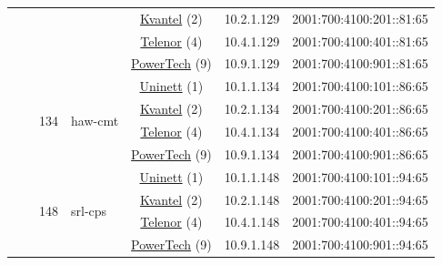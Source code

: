 \begin{small}
\begin{center}
\begin{longtable}{|c|c|c|c|c|c|c|c|}
  &  &  &  & \multicolumn{2}{|c|}{\tiny{\href{http://kvantel.no}{Kvantel} (2)}} & \tiny{10.2.1.129} & \tiny{2001:700:4100:201::81:65} \\* \cline{5-5}\cline{6-6}\cline{7-7}\cline{8-8}
  &  &  &  & \multicolumn{2}{|c|}{\tiny{\href{https://www.telenor.no}{Telenor} (4)}} & \tiny{10.4.1.129} & \tiny{2001:700:4100:401::81:65} \\* \cline{5-5}\cline{6-6}\cline{7-7}\cline{8-8}
  &  &  &  & \multicolumn{2}{|c|}{\tiny{\href{http://www.powertech.no}{PowerTech} (9)}} & \tiny{10.9.1.129} & \tiny{2001:700:4100:901::81:65} \\* \cline{3-3}\cline{4-4}\cline{5-5}\cline{6-6}\cline{7-7}\cline{8-8}
  &  & \multirow{4}{*}{\tiny{134}} & \multicolumn{1}{|l|}{\multirow{4}{*}{\tiny{haw-cmt}}} & \multicolumn{2}{|c|}{\tiny{\href{https://www.uninett.no}{Uninett} (1)}} & \tiny{10.1.1.134} & \tiny{2001:700:4100:101::86:65} \\* \cline{5-5}\cline{6-6}\cline{7-7}\cline{8-8}
  &  &  &  & \multicolumn{2}{|c|}{\tiny{\href{http://kvantel.no}{Kvantel} (2)}} & \tiny{10.2.1.134} & \tiny{2001:700:4100:201::86:65} \\* \cline{5-5}\cline{6-6}\cline{7-7}\cline{8-8}
  &  &  &  & \multicolumn{2}{|c|}{\tiny{\href{https://www.telenor.no}{Telenor} (4)}} & \tiny{10.4.1.134} & \tiny{2001:700:4100:401::86:65} \\* \cline{5-5}\cline{6-6}\cline{7-7}\cline{8-8}
  &  &  &  & \multicolumn{2}{|c|}{\tiny{\href{http://www.powertech.no}{PowerTech} (9)}} & \tiny{10.9.1.134} & \tiny{2001:700:4100:901::86:65} \\* \cline{3-3}\cline{4-4}\cline{5-5}\cline{6-6}\cline{7-7}\cline{8-8}
  &  & \multirow{4}{*}{\tiny{148}} & \multicolumn{1}{|l|}{\multirow{4}{*}{\tiny{srl-cps}}} & \multicolumn{2}{|c|}{\tiny{\href{https://www.uninett.no}{Uninett} (1)}} & \tiny{10.1.1.148} & \tiny{2001:700:4100:101::94:65} \\* \cline{5-5}\cline{6-6}\cline{7-7}\cline{8-8}
  &  &  &  & \multicolumn{2}{|c|}{\tiny{\href{http://kvantel.no}{Kvantel} (2)}} & \tiny{10.2.1.148} & \tiny{2001:700:4100:201::94:65} \\* \cline{5-5}\cline{6-6}\cline{7-7}\cline{8-8}
  &  &  &  & \multicolumn{2}{|c|}{\tiny{\href{https://www.telenor.no}{Telenor} (4)}} & \tiny{10.4.1.148} & \tiny{2001:700:4100:401::94:65} \\* \cline{5-5}\cline{6-6}\cline{7-7}\cline{8-8}
  &  &  &  & \multicolumn{2}{|c|}{\tiny{\href{http://www.powertech.no}{PowerTech} (9)}} & \tiny{10.9.1.148} & \tiny{2001:700:4100:901::94:65} \\* \cline{3-3}\cline{4-4}\cline{5-5}\cline{6-6}\cline{7-7}\cline{8-8}

\end{longtable}
\end{center}
\end{small}
